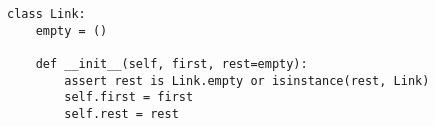 \begin{lstlisting}
class Link:
    empty = ()

    def __init__(self, first, rest=empty):
        assert rest is Link.empty or isinstance(rest, Link)
        self.first = first
        self.rest = rest
\end{lstlisting}
